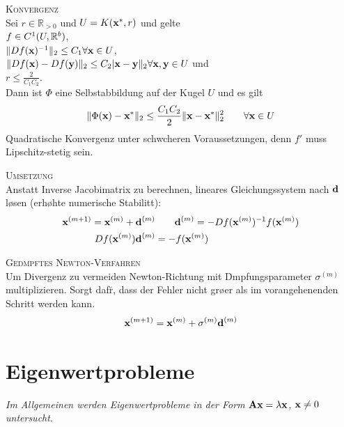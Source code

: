 \textsc{Konvergenz}\\
Sei $r\in \mathbb{R}_{>0}$ und $U= K(\mbox{\bf x}^*,r)$ und gelte \\
$f\in C^1(U,\mathbb{R}^{b})$,\\
 $\Vert Df(\mbox{\bf x})^{-1}\Vert_2 \leq C_1 \forall \mbox{\bf x} \in U$,\\
$\Vert Df(\mbox{\bf x}) - Df(\mbox{\bf y})\Vert_2 \leq C_2 \vert \mbox{\bf x} - \mbox{\bf y} \Vert_2 \forall \mbox{\bf x}, \mbox{\bf y} \in U$ und \\
$r\leq \frac{2}{C_1C_2}$.\\
Dann ist $\Phi$ eine Selbstabbildung auf der Kugel $U$ und es gilt
\begin{align*}
\Vert \Phi(\mbox{\bf x}) - \mbox{\bf x}^*\Vert_2 \leq \frac{C_1C_2}{2}\Vert \mbox{\bf x} - \mbox{\bf x}^* \Vert_2^2 \qquad \forall \mbox{\bf x}\in U
\end{align*}
Quadratische Konvergenz unter schw\a cheren Voraussetzungen, denn $f'$ muss Lipschitz-stetig sein.\vspace{0.2cm}

\textsc{Umsetzung}\\
Anstatt Inverse Jacobimatrix zu berechnen, lineares Gleichungssystem nach $\mbox{\bf d}$ l\o sen (erh\o hte numerische Stabilit\a t):
\begin{align*}
\mbox{\bf x}^{(m+1)} = \mbox{\bf x}^{(m)} + \mbox{\bf d}^{(m)} &\qquad \mbox{\bf d}^{(m)} = -Df(\mbox{\bf x}^{(m)})^{-1}f(\mbox{\bf x}^{(m)})\\
Df(\mbox{\bf x}^{(m)})\mbox{\bf d}^{(m)} &= -f(\mbox{\bf x}^{(m)})
\end{align*}\vspace{0.2cm}

\textsc{Ged\a mpftes Newton-Verfahren}\\
Um Divergenz zu vermeiden Newton-Richtung mit D\a mpfungsparameter $\sigma^{(m)}$ multiplizieren. Sorgt daf\u r, dass der Fehler nicht gr\o \s er als im vorangehenenden Schritt werden kann.
\begin{align*}
\mbox{\bf x}^{(m+1)} = \mbox{\bf x}^{(m)} + \sigma^{(m)}\mbox{\bf d}^{(m)}
\end{align*}

\section{Eigenwertprobleme}
\emph{Im Allgemeinen werden Eigenwertprobleme in der Form $\mbox{\bf Ax}=\lambda \mbox{\bf x}$, $\mbox{\bf x}\neq 0$ untersucht.}

